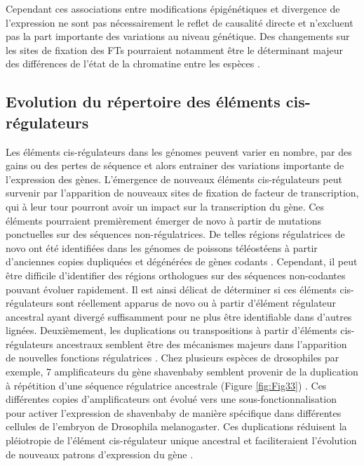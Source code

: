 Cependant ces associations entre modifications épigénétiques et divergence de l’expression ne sont pas nécessairement le reflet de causalité directe et n’excluent pas la part importante des variations au niveau génétique. Des changements sur les sites de fixation des \acrshort{FT}s pourraient notamment être le déterminant majeur des différences de l’état de la chromatine entre les espèces \citep{mcvicker_identification_2013}.

\subsection{Evolution du répertoire des éléments \gls{cis}-régulateurs}
\label{subsec:evol-repertoire}

Les éléments \gls{cis}-régulateurs dans les génomes peuvent varier en nombre, par des gains ou des pertes de séquence et alors entrainer des variations importante de l’expression des gènes. L’émergence de nouveaux éléments \gls{cis}-régulateurs peut survenir par l’apparition de nouveaux sites de fixation de facteur de transcription, qui à leur tour pourront avoir un impact sur la transcription du gène. Ces éléments pourraient premièrement émerger de novo à partir de mutations ponctuelles sur des séquences non-régulatrices. De telles régions régulatrices de novo ont été identifiées dans les génomes de poissons téléostéens à partir d’anciennes copies dupliquées et dégénérées de gènes codants \citep{eichenlaub_novo_2011}. Cependant, il peut être difficile d’identifier des régions orthologues sur des séquences non-codantes pouvant évoluer rapidement. Il est ainsi délicat de déterminer si ces éléments \gls{cis}-régulateurs sont réellement apparus de novo ou à partir d'élément régulateur ancestral ayant divergé suffisamment pour ne plus être identifiable dans d’autres lignées. Deuxièmement, les duplications ou transpositions à partir d’éléments \gls{cis}-régulateurs ancestraux semblent être des mécanismes majeurs dans l’apparition de nouvelles fonctions régulatrices \citep{rebeiz_enhancer_2018}. Chez plusieurs espèces de drosophiles par exemple, 7 \glspl{amplificateur} du gène shavenbaby semblent provenir de la duplication à répétition d'une séquence régulatrice ancestrale  (Figure \ref{fig:Fig33}) \citep{kittelmann_complex_2021}. Ces différentes copies d’\glspl{amplificateur} ont évolué vers une sous-fonctionnalisation pour activer l’expression de shavenbaby de manière spécifique dans différentes cellules de l’embryon de Drosophila melanogaster. Ces duplications réduisent la pléiotropie de l’élément \gls{cis}-régulateur unique ancestral et faciliteraient l’évolution de nouveaux patrons d’expression du gène \citep{murugesan_evolution_2022}. \\

